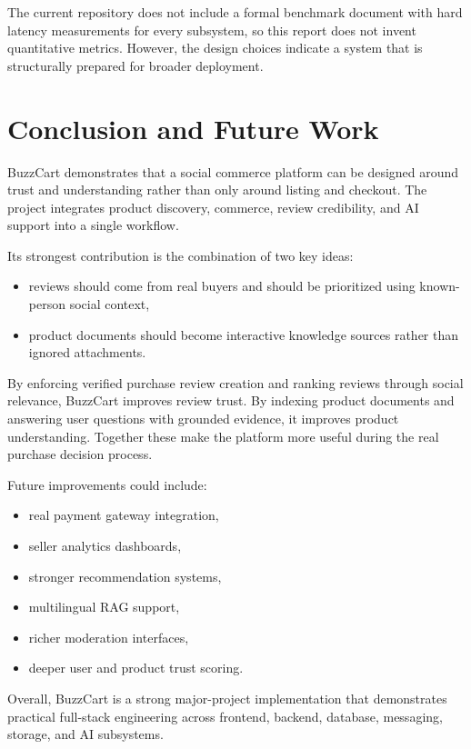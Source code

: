 \documentclass[12pt,letterpaper]{report}
\begin{document}
The current repository does not include a formal benchmark document with hard latency measurements for every subsystem, so this report does not invent quantitative metrics. However, the design choices indicate a system that is structurally prepared for broader deployment.

\chapter{Conclusion and Future Work}

BuzzCart demonstrates that a social commerce platform can be designed around trust and understanding rather than only around listing and checkout. The project integrates product discovery, commerce, review credibility, and AI support into a single workflow.

Its strongest contribution is the combination of two key ideas:

\begin{itemize}
  \item reviews should come from real buyers and should be prioritized using known-person social context,
  \item product documents should become interactive knowledge sources rather than ignored attachments.
\end{itemize}

By enforcing verified purchase review creation and ranking reviews through social relevance, BuzzCart improves review trust. By indexing product documents and answering user questions with grounded evidence, it improves product understanding. Together these make the platform more useful during the real purchase decision process.

Future improvements could include:

\begin{itemize}
  \item real payment gateway integration,
  \item seller analytics dashboards,
  \item stronger recommendation systems,
  \item multilingual RAG support,
  \item richer moderation interfaces,
  \item deeper user and product trust scoring.
\end{itemize}

Overall, BuzzCart is a strong major-project implementation that demonstrates practical full-stack engineering across frontend, backend, database, messaging, storage, and AI subsystems.
\end{document}
